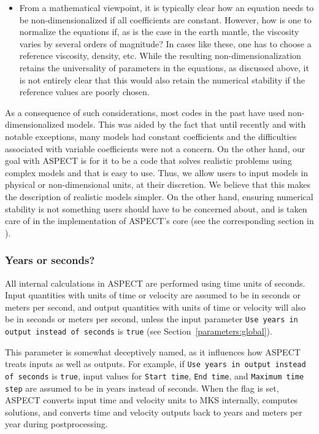 \documentclass{article}
\newcommand{\aspect}{\textsc{ASPECT}}
\begin{document}
\begin{itemize}
  \item From a mathematical viewpoint, it is typically clear how an equation
  needs to be non-dimensionalized if all coefficients are constant. However, how
  is one to normalize the equations if, as is the case in the earth mantle, the
  viscosity varies by several orders of magnitude? In cases like these, one has
  to choose a reference viscosity, density, etc. While the resulting
  non-dimensionalization retains the universality of parameters in the
  equations, as discussed above, it is not entirely clear that this would also
  retain the numerical stability if the reference values are poorly chosen.
\end{itemize}

As a consequence of such considerations, most codes in the past have used
non-dimensionalized models. This was aided by the fact that until recently and
with notable exceptions, many models had constant coefficients and the
difficulties associated with variable coefficients were not a concern. On the
other hand, our goal with \aspect{} is for it to be a code that solves realistic
problems using complex models and that is easy to use. Thus, we allow users to
input models in physical or non-dimensional units, at their discretion. We
believe that this makes the description of realistic models simpler. On
the other hand, ensuring numerical stability is not something users should have
to be concerned about, and is taken care of in the implementation of \aspect{}'s
core (see the corresponding section in \cite{KHB12}).

\subsubsection{Years or seconds?}
\label{sec:years-or-seconds}

All internal calculations in \aspect{} are performed using time units of seconds. 
Input quantities with units of time or velocity are assumed to be in 
seconds or meters per second, and output quantities with units of time or velocity 
will also be in seconds or meters per second, unless the input parameter 
\texttt{Use years in output instead of seconds} is \texttt{true} 
(see Section~\ref{parameters:global}).

This parameter is somewhat deceptively named, as it influences how \aspect{} 
treats inputs as well as outputs. For example, if \texttt{Use years in output instead 
of seconds} is \texttt{true}, input values for \texttt{Start time}, 
\texttt{End time}, and \texttt{Maximum time step} are assumed to be in years 
instead of seconds. When the flag is set, \aspect{} converts input time and velocity 
units to MKS internally, computes solutions, and converts time and velocity outputs 
back to years and meters per year during postprocessing.
\end{document}
